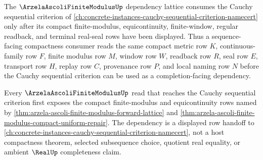 The $\ArzelaAscoliFiniteModulusUp$ dependency lattice consumes the Cauchy sequential criterion of \autoref{ch:concrete-instances-cauchy-sequential-criterion-namecert} only after its compact finite-modulus, equicontinuity, finite-window, regular readback, and terminal real-seal rows have been displayed. Thus a sequence-facing compactness consumer reads the same compact metric row $K$, continuous-family row $F$, finite modulus row $M$, window row $W$, readback row $R$, seal row $E$, transport row $H$, replay row $C$, provenance row $P$, and local naming row $N$ before the Cauchy sequential criterion can be used as a completion-facing dependency.

Every $\ArzelaAscoliFiniteModulusUp$ read that reaches the Cauchy sequential criterion first exposes the compact finite-modulus and equicontinuity rows named by \autoref{thm:arzela-ascoli-finite-modulus-forward-lattice} and \autoref{thm:arzela-ascoli-finite-modulus-compact-uniform-repair}. The dependency is a displayed row handoff to \autoref{ch:concrete-instances-cauchy-sequential-criterion-namecert}, not a host compactness theorem, selected subsequence choice, quotient real equality, or ambient $\RealUp$ completeness claim.
